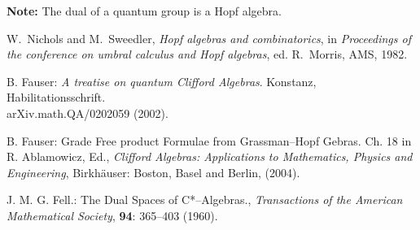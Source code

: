 \documentclass[12pt]{article}
\theoremstyle{definition}
\begin{document}
\textbf{Note:}
The dual of a quantum group is a Hopf algebra.   


\begin{thebibliography}{99}
W.~Nichols and M.~Sweedler, {\it Hopf algebras and combinatorics}, in {\it Proceedings of the conference on umbral calculus and Hopf algebras}, ed. R.~Morris, AMS, 1982.

B. Fauser: \emph{A treatise on quantum Clifford Algebras}. Konstanz,
Habilitationsschrift. \\ arXiv.math.QA/0202059 (2002).

B. Fauser: Grade Free product Formulae from Grassman--Hopf Gebras.
Ch. 18 in R. Ablamowicz, Ed., \emph{Clifford Algebras: Applications to Mathematics, Physics and Engineering}, Birkh\"{a}user: Boston, Basel and Berlin, (2004).

J. M. G. Fell.: The Dual Spaces of  C*--Algebras., \emph{Transactions of the American
Mathematical Society}, \textbf{94}: 365--403 (1960).
\end{thebibliography}
\end{document}
